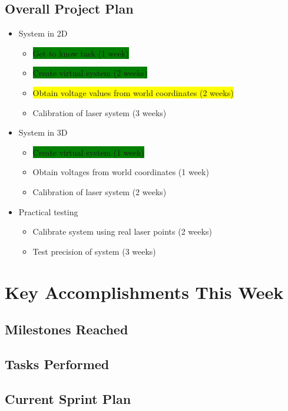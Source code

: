 \documentclass[12pt,notitlepage]{article}
\begin{document}
\subsection{Overall Project Plan}
\begin{itemize}
	\item System in 2D
	\begin{itemize}
		\item \colorbox{green}{Get to know task (1 week)}
		\item \colorbox{green}{Create virtual system (2 weeks)}
		\item \colorbox{yellow}{Obtain voltage values from world coordinates (2 weeks)}
		\item Calibration of laser system (3 weeks)
	\end{itemize}
	\item System in 3D
	\begin{itemize}
		\item \colorbox{green}{Create virtual system (1 week)}
		\item Obtain voltages from world coordinates (1 week)
		\item Calibration of laser system (2 weeks)
	\end{itemize}
	\item Practical testing
	\begin{itemize}
		\item Calibrate system using real laser points (2 weeks)
		\item Test precision of system (3 weeks)
	\end{itemize}
\end{itemize}

\section{Key Accomplishments This Week}
\subsection{Milestones Reached}

\subsection{Tasks Performed}

\subsection{Current Sprint Plan}
\end{document}
